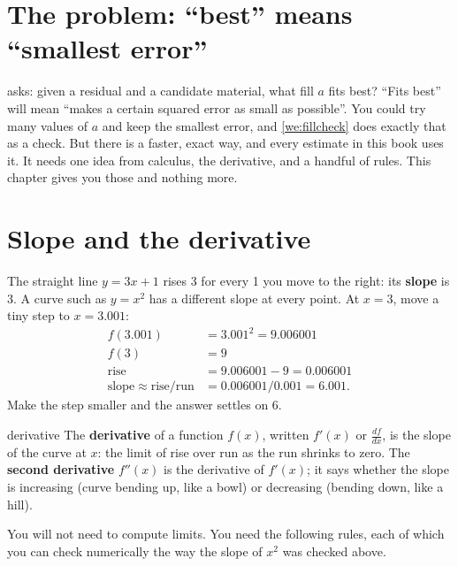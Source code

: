 \documentclass[11pt,a4paper,oneside,openany]{book}
\begin{document}
\section{The problem: ``best'' means ``smallest error''}

 asks: given a residual and a candidate material, what fill $a$ fits best? ``Fits best'' will mean ``makes a
certain squared error as small as possible''. You could try many values of $a$ and keep the smallest error, and
\cref{we:fillcheck} does exactly that as a check. But there is a faster, exact way, and every estimate in this book uses it. It
needs one idea from calculus, the derivative, and a handful of rules. This chapter gives you those and nothing more.

\section{Slope and the derivative}

The straight line $y=3x+1$ rises 3 for every 1 you move to the right: its \textbf{slope} is 3. A curve such as $y=x^2$ has a
different slope at every point. At $x=3$, move a tiny step to $x=3.001$:
\begin{align*}
f(3.001) &= 3.001^2=9.006001\\
f(3) &= 9\\
\text{rise} &= 9.006001-9=0.006001\\
\text{slope}\approx\text{rise}/\text{run} &= 0.006001/0.001=6.001 .
\end{align*}
Make the step smaller and the answer settles on 6.

\begin{defn}{derivative}
The \textbf{derivative} of a function $f(x)$, written $f'(x)$ or $\frac{df}{dx}$, is the slope of the curve at $x$: the limit
of rise over run as the run shrinks to zero. The \textbf{second derivative} $f''(x)$ is the derivative of $f'(x)$; it says
whether the slope is increasing (curve bending up, like a bowl) or decreasing (bending down, like a hill).
\end{defn}

You will not need to compute limits. You need the following rules, each of which you can check numerically the way the slope of
$x^2$ was checked above.
\end{document}
